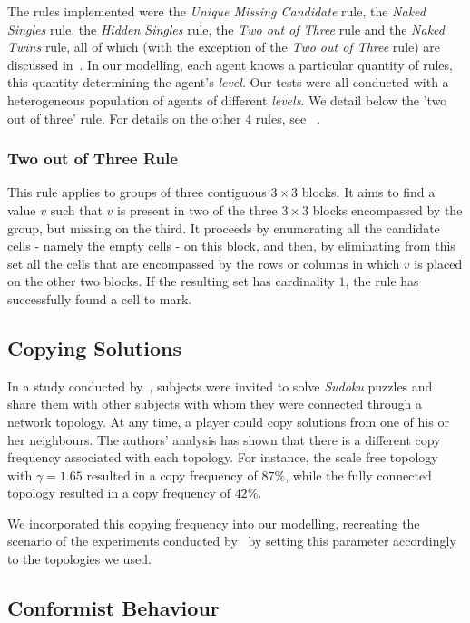 \documentclass{article}
\begin{document}
The rules implemented were the {\em Unique Missing Candidate} rule, the {\em Naked Singles} rule, the {\em Hidden Singles} rule, the {\em Two out of Three} rule and the {\em Naked Twins} rule, all of which (with the exception of the {\em Two out of Three} rule) are discussed in~\cite{davis:mathsudoku}. In our modelling, each agent knows a particular quantity of rules, this quantity determining the agent's {\em level}. Our tests were all conducted with a heterogeneous population of agents of different {\em levels}. We detail below the 'two out of three' rule. For details on the other $4$ rules, see ~\cite{davis:mathsudoku}.

\subsubsection{Two out of Three Rule}

This rule applies to groups of three contiguous $3 \times 3$ blocks. It aims to find a value $v$ such that $v$ is present in two of the three $3 \times 3$ blocks encompassed by the group, but missing on the third. It proceeds by enumerating all the candidate cells - namely the empty cells - on this block, and then, by eliminating from this set all the cells that are encompassed by the rows or columns in which $v$ is placed on the other two blocks. If the resulting set has cardinality $1$, the rule has successfully found a cell to mark.

\subsection{Copying Solutions}

In a study conducted by~\cite{farenzena:collabem}, subjects were invited to solve {\em Sudoku} puzzles and share them with other subjects with whom they were connected through a network topology. At any time, a player could copy solutions from one of his or her neighbours. The authors' analysis has shown that there is a different copy frequency associated with each topology. For instance, the scale free topology with $\gamma = 1.65$ resulted in a copy frequency of $87 \%$, while the fully connected topology resulted in a copy frequency of $42 \%$.

We incorporated this copying frequency into our modelling, recreating the scenario of the experiments conducted by~\cite{farenzena:collabem} by setting this parameter accordingly to the topologies we used.

\subsection{Conformist Behaviour}
\end{document}
